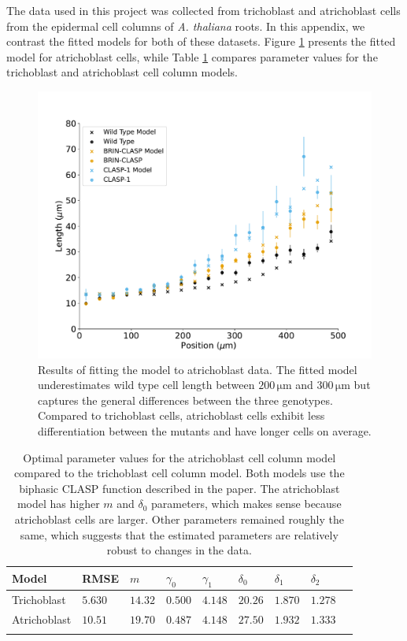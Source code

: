 \documentclass[referee,pdflatex,sn-mathphys-num]{sn-jnl}
\newcommand{\um}{\,\unit{\micro\metre}}
\begin{document}
\begin{appendices}
The data used in this project was collected from trichoblast and atrichoblast cells from the epidermal cell columns of \emph{A. thaliana} roots.
In this appendix, we contrast the fitted models for both of these datasets.
Figure \ref{column-atrichoblast-fit} presents the fitted model for atrichoblast cells, while Table \ref{column-atrichoblast-parameters} compares parameter values for the trichoblast and atrichoblast cell column models.

\begin{figure}[!htp]
  \centering
  \includegraphics[width=\textwidth]{column-atrichoblast-fit.pdf}
  \caption{Results of fitting the model to atrichoblast data.
    The fitted model underestimates wild type cell length between $200\um$ and $300\um$ but captures the general differences between the three genotypes.
Compared to trichoblast cells, atrichoblast cells exhibit less differentiation between the mutants and have longer cells on average. }
  \label{column-atrichoblast-fit}
\end{figure}

\begin{table}[!htp]
\centering
\caption{Optimal parameter values for the atrichoblast cell column model compared to the trichoblast cell column model.
Both models use the biphasic CLASP function described in the paper.
The atrichoblast model has higher $m$ and $\delta_{0}$ parameters, which makes sense because atrichoblast cells are larger.
Other parameters remained roughly the same, which suggests that the estimated parameters are relatively robust to changes in the data.} 
\label{column-atrichoblast-parameters}
\begin{tabular}{@{}lllllllll@{}}
\toprule
Model & RMSE & $m$ & $\gamma_{0}$ & $\gamma_{1}$ & $\delta_{0}$ & $\delta_{1}$ & $\delta_{2}$ \\
\midrule
Trichoblast & $5.630$ & $14.32$ & $0.500$ & $4.148$ & $20.26$ & $1.870$ & $1.278$ \\
Atrichoblast & $10.51$ & $19.70$ & $0.487$ & $4.148$ & $27.50$ & $1.932$ & $1.333$ \\
\botrule
\end{tabular}
\end{table}


\end{appendices}
\end{document}
